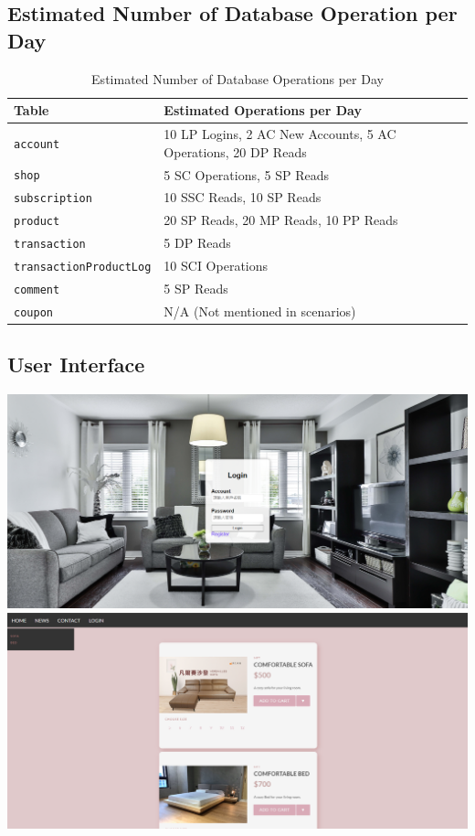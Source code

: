 \documentclass[a4paper, 12pt]{article}
\begin{document}
\subsection{Estimated Number of Database Operation per Day}
\begin{table}[h]
    \begin{tabular}{|p{5cm}|p{7cm}|}
        \hline
        \textbf{Table} & \textbf{Estimated Operations per Day} \\
        \hline
        \texttt{account} & 10 LP Logins, 2 AC New Accounts, 5 AC Operations, 20 DP Reads \\
        \hline
        \texttt{shop} & 5 SC Operations, 5 SP Reads \\
        \hline
        \texttt{subscription} & 10 SSC Reads, 10 SP Reads \\
        \hline
        \texttt{product} & 20 SP Reads, 20 MP Reads, 10 PP Reads \\
        \hline
        \texttt{transaction} & 5 DP Reads \\
        \hline
        \texttt{transactionProductLog} & 10 SCI Operations \\
        \hline
        \texttt{comment} & 5 SP Reads \\
        \hline
        \texttt{coupon} & N/A (Not mentioned in scenarios) \\
        \hline
    \end{tabular}
    \caption{Estimated Number of Database Operations per Day}
    \label{tab:estimated-database-operations}
\end{table}
\newpage
\subsection{User Interface}
\begin{center}
\includegraphics[scale=0.4]{ui/Login.png}
\includegraphics[scale=0.4]{ui/MainPage.png}
\end{center}
\newpage
\end{document}
